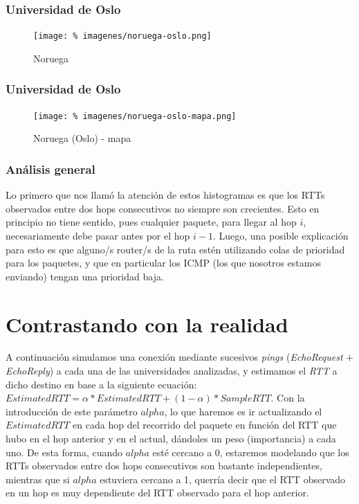 \documentclass[final,inline,a4paper,narroweqnarray]{ieee}
\let\Oldsection\section
\renewcommand{\section}{\FloatBarrier\Oldsection}
\let\Oldsubsubsection\subsubsection
\renewcommand{\subsubsection}{\FloatBarrier\Oldsubsubsection}
\begin{document}
\subsubsection{Universidad de Oslo}
\begin{figure}[ht]\begin{center}
   \texttt{[image: \%
    imagenes/noruega-oslo.png]}
    \caption{Noruega}
    \label{Noruega}
\end{center}\end{figure}

\subsubsection{Universidad de Oslo}
\begin{figure}[ht]\begin{center}
   \texttt{[image: \%
    imagenes/noruega-oslo-mapa.png]}
    \caption{Noruega (Oslo) - mapa}
    \label{Noruega}
\end{center}\end{figure}

\subsubsection{Análisis general}
Lo primero que nos llamó la atención de estos histogramas es que los RTTs observados entre dos
hops consecutivos no siempre son crecientes. Esto en principio no tiene sentido, pues cualquier 
paquete, para llegar al hop $i$, necesariamente debe pasar antes por el hop $i-1$. Luego, 
una posible explicación para esto es que alguno/s router/s de la ruta estén utilizando colas
de prioridad para los paquetes, y que en particular los ICMP (los que nosotros estamos enviando)
tengan una prioridad baja. 

\section{Contrastando con la realidad}
A continuación simulamos una conexión mediante sucesivos \emph{pings} (\emph{EchoRequest} $+$ 
\emph{EchoReply}) 
a cada una de las universidades analizadas, y estimamos el \emph{RTT} a dicho destino 
en base a la siguiente ecuación: 
$ EstimatedRTT = \alpha * EstimatedRTT + (1 - \alpha) * SampleRTT $. Con la introducción de
este parámetro $alpha$, lo que haremos es ir actualizando el $EstimatedRTT$ en cada hop del 
recorrido del paquete en función del RTT que hubo en el hop anterior y en el actual, dándoles
un peso (importancia) a cada uno. De esta forma, cuando $alpha$ esté cercano a 0, estaremos
modelando que los RTTs observados entre dos hops consecutivos son bastante independientes,
mientras que si $alpha$ estuviera cercano a 1, querría decir que el RTT observado en un
hop es muy dependiente del RTT observado para el hop anterior. 
\end{document}
